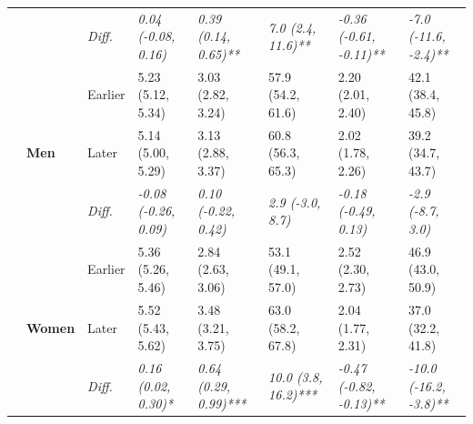 \documentclass[12pt, a4paper]{article}
\begin{document}
\begin{appendices}
\begin{table}[!p]
{\begin{tabular}[t]{>{}l>{}lllllll}
        \cmidrule{3-8}
                                              &                                   & \cellcolor{gray!10}\em{Diff.} & \cellcolor{gray!10}\em{0.04 (-0.08, 0.16)}  & \cellcolor{gray!10}\em{0.39 (0.14, 0.65)**}  & \cellcolor{gray!10}\em{7.0 (2.4, 11.6)**}   & \cellcolor{gray!10}\em{-0.36 (-0.61, -0.11)**}  & \cellcolor{gray!10}\em{-7.0 (-11.6, -2.4)**}   \\
        \cmidrule{2-8}
                                              & \multirow{3}{*}{\textbf{Men}}     & Earlier                       & 5.23 (5.12, 5.34)                           & 3.03 (2.82, 3.24)                            & 57.9 (54.2, 61.6)                           & 2.20 (2.01, 2.40)                               & 42.1 (38.4, 45.8)                              \\
        \cmidrule{3-8}
                                              &                                   & Later                         & 5.14 (5.00, 5.29)                           & 3.13 (2.88, 3.37)                            & 60.8 (56.3, 65.3)                           & 2.02 (1.78, 2.26)                               & 39.2 (34.7, 43.7)                              \\
        \cmidrule{3-8}
                                              &                                   & \cellcolor{gray!10}\em{Diff.} & \cellcolor{gray!10}\em{-0.08 (-0.26, 0.09)} & \cellcolor{gray!10}\em{0.10 (-0.22, 0.42)}   & \cellcolor{gray!10}\em{2.9 (-3.0, 8.7)}     & \cellcolor{gray!10}\em{-0.18 (-0.49, 0.13)}     & \cellcolor{gray!10}\em{-2.9 (-8.7, 3.0)}       \\
        \cmidrule{2-8}
                                              & \multirow{3}{*}{\textbf{Women}}   & Earlier                       & 5.36 (5.26, 5.46)                           & 2.84 (2.63, 3.06)                            & 53.1 (49.1, 57.0)                           & 2.52 (2.30, 2.73)                               & 46.9 (43.0, 50.9)                              \\
        \cmidrule{3-8}
                                              &                                   & Later                         & 5.52 (5.43, 5.62)                           & 3.48 (3.21, 3.75)                            & 63.0 (58.2, 67.8)                           & 2.04 (1.77, 2.31)                               & 37.0 (32.2, 41.8)                              \\
        \cmidrule{3-8}
                                              &                                   & \cellcolor{gray!10}\em{Diff.} & \cellcolor{gray!10}\em{0.16 (0.02, 0.30)*}  & \cellcolor{gray!10}\em{0.64 (0.29, 0.99)***} & \cellcolor{gray!10}\em{10.0 (3.8, 16.2)***} & \cellcolor{gray!10}\em{-0.47 (-0.82, -0.13)**}  & \cellcolor{gray!10}\em{-10.0 (-16.2, -3.8)**}  \\

\end{tabular}}
\end{table}
\end{appendices}
\end{document}
